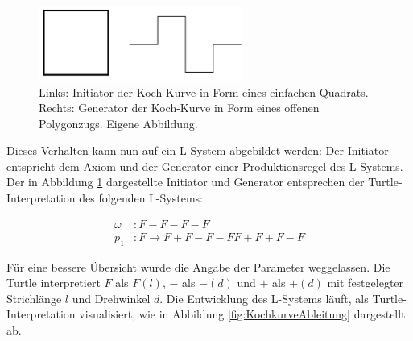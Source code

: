 \begin{figure} [hbtp]
	\centering
	\includegraphics[width=0.6\textwidth]{images/InitiatorGenerator.png}
	\caption{Links: Initiator der Koch-Kurve in Form eines einfachen Quadrats. Rechts: Generator der Koch-Kurve in Form eines offenen Polygonzugs. Eigene Abbildung.}
	\label{fig:InitiatorGenerator}
\end{figure}

Dieses Verhalten kann nun auf ein L-System abgebildet werden: Der Initiator entspricht dem Axiom und der Generator einer Produktionsregel des L-Systems. Der in Abbildung \ref{fig:InitiatorGenerator} dargestellte Initiator und Generator entsprechen der Turtle-Interpretation des folgenden L-Systems:

\begin{equation}
\begin{array}{llll}
\omega & : F-F-F-F \\
p_1 & : F \rightarrow F+F-F-FF+F+F-F
\end{array}
\label{eq:ProdKochKurve}
\end{equation} 

Für eine bessere Übersicht wurde die Angabe der Parameter weggelassen. Die Turtle interpretiert $F$ als $F(l)$, $-$ als $-(d)$ und $+$ als $+(d)$ mit festgelegter Strichlänge $l$ und Drehwinkel $d$. \label{desc:TurtleWithoutParams} Die Entwicklung des L-Systems läuft, als Turtle-Interpretation visualisiert, wie in Abbildung \ref{fig:KochkurveAbleitung} dargestellt ab.

